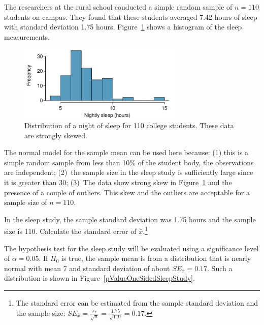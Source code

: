 \begin{spacing}{1.5}
The researchers at the rural school conducted a simple random sample of $n=110$ students on campus. They found that these students averaged 7.42 hours of sleep with standard deviation  1.75 hours.  Figure~\ref{histOfSleepForCollegeThatWasCheckingForMoreThan7Hours} shows a histogram of the sleep measurements.

\begin{figure}
\centering
\includegraphics[width=0.7\textwidth]{ch_inference_foundations_oi_biostat/figures/histOfSleepForCollegeThatWasCheckingForMoreThan7Hours/histOfSleepForCollegeThatWasCheckingForMoreThan7Hours}
\caption{Distribution of a night of sleep for 110 college students. These data are strongly skewed.}
\label{histOfSleepForCollegeThatWasCheckingForMoreThan7Hours}
\end{figure}

The normal model for the sample mean can be used here because: (1) this is a simple random sample from less than 10\% of the student body, the observations are independent; (2)~the sample size in the sleep study is sufficiently large since it is greater than 30; (3)~The data show strong skew in Figure~\ref{histOfSleepForCollegeThatWasCheckingForMoreThan7Hours} and the presence of a couple of outliers. This skew and the outliers are acceptable for a sample size of $n=110$. 

\begin{exercise} \label{findSEOfFirstSleepStudyCheckingGreaterThan7Hours}
In the sleep study, the sample standard deviation was 1.75 hours and the sample size is 110. Calculate the standard error of $\bar{x}$.\footnote{The standard error can be estimated from the sample standard deviation and the sample size: $SE_{\bar{x}} = \frac{s_x}{\sqrt{n}} = \frac{1.75}{\sqrt{110}} = 0.17$.}
\end{exercise}

The hypothesis test for the sleep study will be evaluated using a significance level of $\alpha = 0.05$. If $H_0$ is true, the sample mean is from a distribution that is nearly normal with mean 7 and standard deviation of about $SE_{\bar{x}} = 0.17$. Such a distribution is shown in Figure~\ref{pValueOneSidedSleepStudy}.


\end{spacing}
